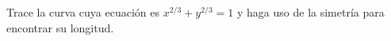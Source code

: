 \item Trace la curva cuya ecuación es $x^{2/3} + y^{2/3} = 1$ y haga uso de la simetría para encontrar su longitud.
